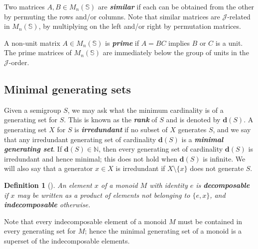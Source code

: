 \documentclass[11pt]{article}
\newtheorem{defi}[thm]{Definition}
\newenvironment{de}[1][]{\begin{defi}[#1]\rm}{\end{defi}}
\newcommand{\defn}[1]{\textbf{\textit{#1}}}
\numberwithin{equation}{section}
\newcommand{\J}{\mathscr{J}}
\newcommand{\N}{\mathbb{N}}
\begin{document}
Two matrices $A, B\in M_n(\mathbb{S})$ are \defn{similar} if each can be
obtained from the other by permuting the rows and/or columns. Note that similar
matrices are $\J$-related in $M_n(\mathbb{S})$, by multiplying on the left
and/or right by permutation matrices.

A non-unit matrix $A \in M_n(\mathbb{S})$ is \defn{prime} if $A = BC$ implies
$B$ or $C$ is a unit. The prime matrices of $M_n(\mathbb{S})$ are immediately
below the group of units in the $\J$-order. 

\subsection{Minimal generating sets}
\label{sec:MinimalGenSets}

Given a semigroup $S$, we may ask what the minimum cardinality is of a
generating set for $S$. This is known as the \defn{rank} of $S$ and is denoted
by $\mathbf{d}(S)$. A generating set $X$ for $S$ is \defn{irredundant} if no
subset of $X$ generates $S$, and we say that any irredundant generating set of
cardinality $\mathbf{d}(S)$ is a \defn{minimal generating set}. If
$\mathbf{d}(S) \in \N$, then every generating set of cardinality $\mathbf{d}(S)$
is irredundant and hence minimal; this does not hold when $\mathbf{d}(S)$ is
infinite. We will also say that a generator $x \in X$ is irredundant if $X
\setminus \{x\}$ does not generate $S$.

\begin{de}
  An element $x$ of a monoid $M$ with identity $e$ is \defn{decomposable} if $x$
  may be written as a product of elements not belonging to $\{e, x\}$, and
  \defn{indecomposable} otherwise.
\end{de}
Note that every indecomposable element of a monoid $M$ must be contained in
every generating set for $M$; hence the minimal generating set of a monoid is a
superset of the indecomposable elements.
\end{document}

